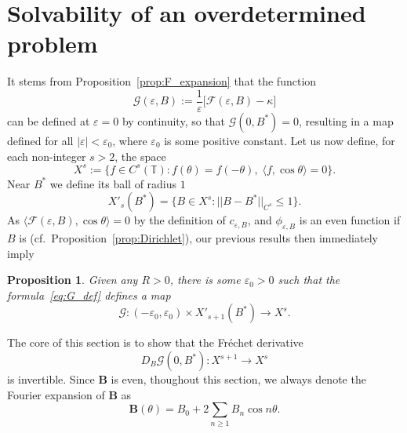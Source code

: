 \documentclass[12pt,reqno]{amsart}
\numberwithin{equation}{section}
\newtheorem{proposition}[theorem]{Proposition}
\theoremstyle{definition}
\theoremstyle{remark}
\newtheorem{remark}[theorem]{Remark}
\begin{document}
 
 
 
\section{Solvability of an overdetermined problem} \label{sec: invertibility}

It stems from Proposition~\ref{prop:F_expansion} that the function
\begin{equation}\label{eq:G_def}
\mathcal{G}(\varepsilon,B) := \frac1\varepsilon \bigl[ \mathcal{F}(\varepsilon,B) - \kappa \bigr]
\end{equation}
can be defined at $\varepsilon=0$ by continuity, so that $\mathcal{G}(0,B^*)=0$, resulting in a map defined for all $|\varepsilon|<\varepsilon_0$, where $\varepsilon_0$ is some positive constant.
Let us now define, for each non-integer $s>2$, the space
\[
X^s := \bigl\{ f \in C^s(\mathbb{T}) : f(\theta)=f(-\theta),\;
\langle f,\cos\theta\rangle = 0 \bigr\} .
\]
Near $B^*$ we define its ball of radius $1$
\begin{equation*}%
X'_{s}(B^*)=\{B\in X^{s}:||{B-B^*}||_{C^{s}}\le 1\}.
\end{equation*}
As $\langle\mathcal{F}(\varepsilon,B),\cos\theta\rangle = 0$ by the definition of $c_{\varepsilon,B}$, and $\phi_{\varepsilon,B}$ is an even function if $B$ is (cf.\ Proposition~\ref{prop:Dirichlet}), our previous results then immediately imply
\begin{proposition}\label{prop:G}
	Given any $R>0$, there is some $\varepsilon_0>0$ such that the formula~\eqref{eq:G_def} defines a map
	\[
	\mathcal{G} : (-\varepsilon_0,\varepsilon_0) \times X'_{s+1}(B^*) \to X^s .
	\]
\end{proposition} 

The core of this section is  to show that the Fr\'echet derivative  
\begin{equation*}%
D_B\mathcal{G}(0,B^*):X^{s+1}\to X^s
\end{equation*}
is invertible.  Since  $ \textbf{B}  $ is even, thoughout this section, we always denote the Fourier expansion of $ \textbf{B} $ as $$ \textbf{B}(\theta) =  B_0+2\sum_{n\geq 1} B_n \cos n\theta. $$ 
\end{document}
